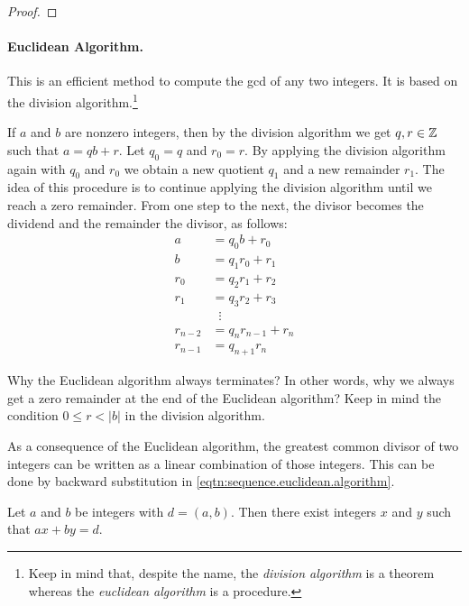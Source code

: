 \documentclass[11pt,a4paper]{article}
\begin{document}
\begin{proof}
    
\end{proof}



\paragraph{Euclidean Algorithm.} This is an efficient method to compute the gcd of any  two integers.
It is based on the division algorithm.\footnote{Keep in mind that, despite the name, the \textit{division algorithm} is a theorem whereas the \textit{euclidean algorithm} is a procedure.}


If \(a\) and \(b\) are nonzero integers, then by the division algorithm we get \(q,r\in \mathbb{Z}\) such that \(a= qb+r\).
Let \(q_0=q\) and \(r_0=r\).
By applying the division algorithm again with \(q_0\) and \(r_0\) we obtain a new quotient \(q_1\)   and a new remainder \(r_1\).
The idea of this procedure is to continue applying the division algorithm until we reach a zero remainder. From one step to the next,  the divisor becomes the dividend and the remainder the divisor, as follows:
\begin{equation}\label{eqtn:sequence.euclidean.algorithm}
\begin{aligned}
    a & =q_0 b+r_0 \\
    b & =q_1 r_0+r_1 \\
    r_0 & =q_2 r_1+r_2 \\
    r_1 & =q_3 r_2+r_3 \\
    &\;\; \vdots \\
    r_{n-2} & =q_n r_{n-1}+r_n \\
    r_{n-1} & =q_{n+1} r_n
\end{aligned}
\end{equation}


\begin{que}
    Why the Euclidean algorithm always terminates? In other words,
    why we always get a zero remainder at the end of the Euclidean algorithm? 
    Keep in mind the condition \(0\leq r < |b|\) in the division algorithm.
\end{que}

As a consequence of the Euclidean algorithm,
the greatest common divisor of two integers can be written as a linear combination of those integers. This can be done by backward substitution in \eqref{eqtn:sequence.euclidean.algorithm}.

\begin{teo}
    Let $a$ and $b$ be integers with $d=(a,b)$. Then there exist integers $x$ and $y$ such that $a x+b y=d$. 
\end{teo}
\end{document}
